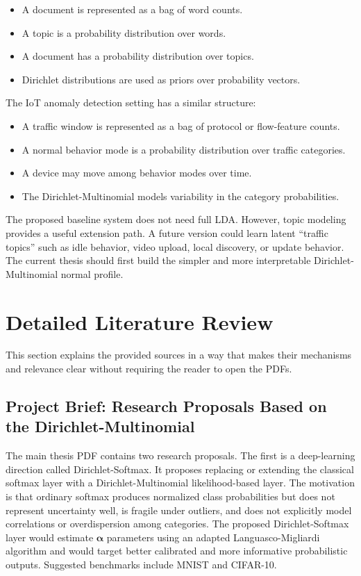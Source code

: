 \documentclass[11pt,a4paper]{article}
\begin{document}
\begin{itemize}
  \item A document is represented as a bag of word counts.
  \item A topic is a probability distribution over words.
  \item A document has a probability distribution over topics.
  \item Dirichlet distributions are used as priors over probability vectors.
\end{itemize}

The IoT anomaly detection setting has a similar structure:

\begin{itemize}
  \item A traffic window is represented as a bag of protocol or flow-feature counts.
  \item A normal behavior mode is a probability distribution over traffic categories.
  \item A device may move among behavior modes over time.
  \item The Dirichlet-Multinomial models variability in the category probabilities.
\end{itemize}

The proposed baseline system does not need full LDA. However, topic modeling provides a useful extension path. A future version could learn latent ``traffic topics'' such as idle behavior, video upload, local discovery, or update behavior. The current thesis should first build the simpler and more interpretable Dirichlet-Multinomial normal profile.

\section{Detailed Literature Review}

This section explains the provided sources in a way that makes their mechanisms and relevance clear without requiring the reader to open the PDFs.

\subsection{Project Brief: Research Proposals Based on the Dirichlet-Multinomial}

The main thesis PDF contains two research proposals. The first is a deep-learning direction called Dirichlet-Softmax. It proposes replacing or extending the classical softmax layer with a Dirichlet-Multinomial likelihood-based layer. The motivation is that ordinary softmax produces normalized class probabilities but does not represent uncertainty well, is fragile under outliers, and does not explicitly model correlations or overdispersion among categories. The proposed Dirichlet-Softmax layer would estimate \(\boldsymbol{\alpha}\) parameters using an adapted Languasco-Migliardi algorithm and would target better calibrated and more informative probabilistic outputs. Suggested benchmarks include MNIST and CIFAR-10.
\end{document}
